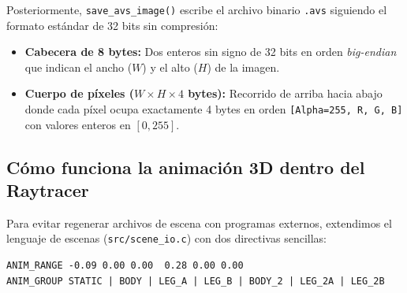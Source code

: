 \documentclass[11pt,letterpaper]{article}
\begin{document}
Posteriormente, \texttt{save\_avs\_image()} escribe el archivo binario \texttt{.avs} siguiendo el formato estándar de 32 bits sin compresión:
\begin{itemize}[leftmargin=1.5em]
    \item \textbf{Cabecera de 8 bytes:} Dos enteros sin signo de 32 bits en orden \textit{big-endian} que indican el ancho ($W$) y el alto ($H$) de la imagen.
    \item \textbf{Cuerpo de píxeles ($W \times H \times 4$ bytes):} Recorrido de arriba hacia abajo donde cada píxel ocupa exactamente 4 bytes en orden \texttt{[Alpha=255, R, G, B]} con valores enteros en $[0, 255]$.
\end{itemize}

\subsection{Cómo funciona la animación 3D dentro del Raytracer}

Para evitar regenerar archivos de escena con programas externos, extendimos el lenguaje de escenas (\texttt{src/scene\_io.c}) con dos directivas sencillas:
\begin{lstlisting}
ANIM_RANGE -0.09 0.00 0.00  0.28 0.00 0.00
ANIM_GROUP STATIC | BODY | LEG_A | LEG_B | BODY_2 | LEG_2A | LEG_2B
\end{lstlisting}
\end{document}
